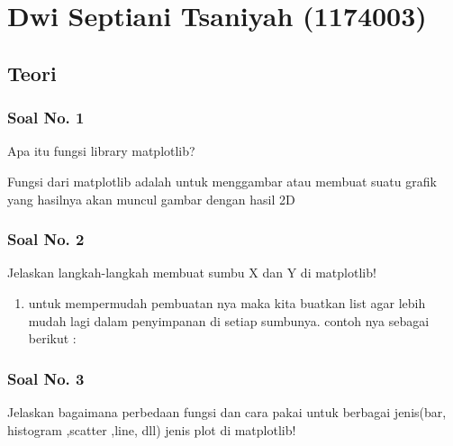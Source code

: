 \section{Dwi Septiani Tsaniyah (1174003)}
\subsection{Teori}
\subsubsection{Soal No. 1}
\hfill \break
Apa itu fungsi library matplotlib?

\hfill \break
Fungsi dari matplotlib adalah untuk menggambar atau membuat suatu grafik yang hasilnya akan muncul gambar dengan hasil 2D

\subsubsection{Soal No. 2}
\hfill \break
Jelaskan langkah-langkah membuat sumbu X dan Y di matplotlib!

\begin{enumerate}
	\item untuk mempermudah pembuatan nya maka kita buatkan list agar lebih mudah lagi dalam penyimpanan di setiap sumbunya.
contoh nya sebagai berikut : 

	
\end{enumerate}
 
\subsubsection{Soal No. 3}
\hfill \break
Jelaskan bagaimana perbedaan fungsi dan cara pakai untuk berbagai jenis(bar, histogram ,scatter ,line, dll) jenis plot di matplotlib!

